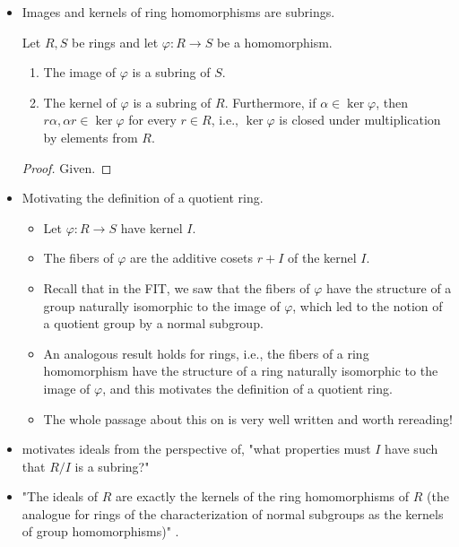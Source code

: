 \documentclass[../notes.tex]{subfiles}
\begin{document}
\begin{itemize}
\begin{enumerate}
\begin{itemize}
        \end{itemize}
    \end{enumerate}
    \item Images and kernels of ring homomorphisms are subrings.
    \begin{proposition}\label{prp:7.5}
        Let $R,S$ be rings and let $\varphi:R\to S$ be a homomorphism.
        \begin{enumerate}
            \item The image of $\varphi$ is a subring of $S$.
            \item The kernel of $\varphi$ is a subring of $R$. Furthermore, if $\alpha\in\ker\varphi$, then $r\alpha,\alpha r\in\ker\varphi$ for every $r\in R$, i.e., $\ker\varphi$ is closed under multiplication by elements from $R$.
        \end{enumerate}
        \begin{proof}
            Given.
        \end{proof}
    \end{proposition}
    \item Motivating the definition of a quotient ring.
    \begin{itemize}
        \item Let $\varphi:R\to S$ have kernel $I$.
        \item The fibers of $\varphi$ are the additive cosets $r+I$ of the kernel $I$.
        \item Recall that in the FIT, we saw that the fibers of $\varphi$ have the structure of a group naturally isomorphic to the image of $\varphi$, which led to the notion of a quotient group by a normal subgroup.
        \item An analogous result holds for rings, i.e., the fibers of a ring homomorphism have the structure of a ring naturally isomorphic to the image of $\varphi$, and this motivates the definition of a quotient ring.
        \item The whole passage about this on \textcite[240-41]{bib:DummitFoote} is very well written and worth rereading!
    \end{itemize}
    \item \textcite{bib:DummitFoote} motivates ideals from the perspective of, "what properties must $I$ have such that $R/I$ is a subring?"
    \item "The ideals of $R$ are exactly the kernels of the ring homomorphisms of $R$ (the analogue for rings of the characterization of normal subgroups as the kernels of group homomorphisms)" \parencite[241]{bib:DummitFoote}.

\end{itemize}
\end{document}
